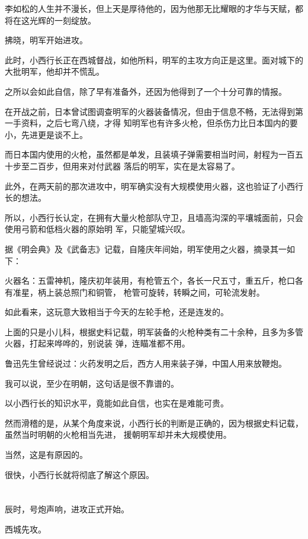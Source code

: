 \documentclass[11pt,a4paper,onecolumn]{article}
\begin{document}
李如松的人生并不漫长，但上天是厚待他的，因为他那无比耀眼的才华与天赋，都将在这光辉的一刻绽放。

拂晓，明军开始进攻。

此时，小西行长正在西城督战，如他所料，明军的主攻方向正是这里。面对城下的大批明军，他却并不慌乱。

之所以会如此自信，除了早有准备外，还因为他得到了一个十分可靠的情报。

在开战之前，日本曾试图调查明军的火器装备情况，但由于信息不畅，无法得到第一手资料，之后七弯八绕，才得
知明军也有许多火枪，但杀伤力比日本国内的要小，先进更是谈不上。

而日本国内使用的火枪，虽然都是单发，且装填子弹需要相当时间，射程为一百五十步至二百步，但用来对付武器
落后的明军，实在是太容易了。

此外，在两天前的那次进攻中，明军确实没有大规模使用火器，这也验证了小西行长的想法。

所以，小西行长认定，在拥有大量火枪部队守卫，且墙高沟深的平壤城面前，只会使用弓箭和低档火器的原始明
军，只能望城兴叹。

据《明会典》及《武备志》记载，自隆庆年间始，明军使用之火器，摘录其一如下：

火器名：五雷神机，隆庆初年装用，有枪管五个，各长一尺五寸，重五斤，枪口各有准星，柄上装总照门和铜管，
枪管可旋转，转瞬之间，可轮流发射。

如此看来，这玩意大致相当于今天的左轮手枪，还是连发的。

上面的只是小儿科，根据史料记载，明军装备的火枪种类有二十余种，且多为多管火器，打起来哗哗的，别说装
弹，连瞄准都不用。

鲁迅先生曾经说过：火药发明之后，西方人用来装子弹，中国人用来放鞭炮。

我可以说，至少在明朝，这句话是很不靠谱的。

以小西行长的知识水平，竟能如此自信，也实在是难能可贵。

然而滑稽的是，从某个角度来说，小西行长的判断是正确的，因为根据史料记载，虽然当时明朝的火枪相当先进，
援朝明军却并未大规模使用。

当然，这是有原因的。

很快，小西行长就将彻底了解这个原因。

\section[\thesection]{}

辰时，号炮声响，进攻正式开始。

西城先攻。
\end{document}
